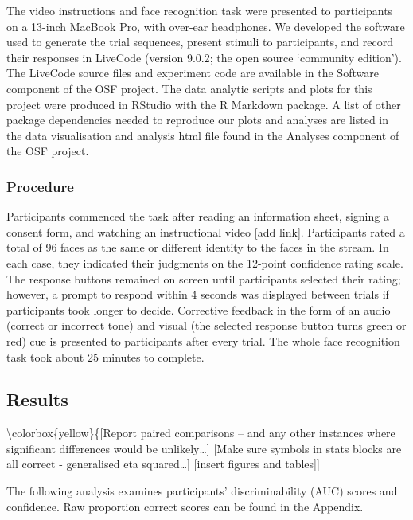 \documentclass[
  english,
  man]{apa6}
\begin{document}
The video instructions and face recognition task were presented to participants on a 13-inch MacBook Pro, with over-ear headphones. We developed the software used to generate the trial sequences, present stimuli to participants, and record their responses in LiveCode (version 9.0.2; the open source `community edition'). The LiveCode source files and experiment code are available in the Software component of the OSF project. The data analytic scripts and plots for this project were produced in RStudio with the R Markdown package. A list of other package dependencies needed to reproduce our plots and analyses are listed in the data visualisation and analysis html file found in the Analyses component of the OSF project.

\hypertarget{procedure}{%
\subsubsection{Procedure}\label{procedure}}

Participants commenced the task after reading an information sheet, signing a consent form, and watching an instructional video {[}add link{]}. Participants rated a total of 96 faces as the same or different identity to the faces in the stream. In each case, they indicated their judgments on the 12-point confidence rating scale. The response buttons remained on screen until participants selected their rating; however, a prompt to respond within 4 seconds was displayed between trials if participants took longer to decide. Corrective feedback in the form of an audio (correct or incorrect tone) and visual (the selected response button turns green or red) cue is presented to participants after every trial. The whole face recognition task took about 25 minutes to complete.

\hypertarget{results}{%
\subsection{Results}\label{results}}

\textbackslash colorbox\{yellow\}\{{[}Report paired comparisons -- and any other instances where significant differences would be unlikely\ldots{]}
{[}Make sure symbols in stats blocks are all correct - generalised eta squared\ldots{]}
{[}insert figures and tables{]}{]}

The following analysis examines participants' discriminability (AUC) scores and confidence. Raw proportion correct scores can be found in the Appendix.
\end{document}

